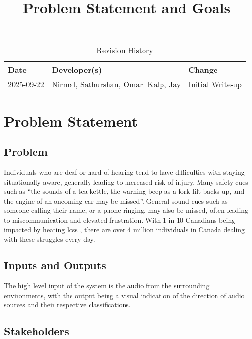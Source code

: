 \documentclass{article}
\title{Problem Statement and Goals\\\progname}
\author{\authname}
\date{}
\begin{document}
\maketitle

\begin{table}[hp]
\caption{Revision History} \label{TblRevisionHistory}
\begin{tabularx}{\textwidth}{llX}
\toprule
\textbf{Date} & \textbf{Developer(s)} & \textbf{Change}\\
\midrule
2025-09-22 & Nirmal, Sathurshan, Omar, Kalp, Jay & Initial Write-up\\
\bottomrule
\end{tabularx}
\end{table}

\section{Problem Statement}

\subsection{Problem}

Individuals who are deaf or hard of hearing tend to have difficulties with
staying situationally aware, generally leading to increased risk of injury. Many
safety cues such as ``the sounds of a tea kettle, the warning beep as a fork lift
backs up, and the engine of an oncoming car may be missed''. \cite{Masterson2016}
General sound cues such as someone calling their name, or a phone ringing, may
also be missed, often leading to miscommunication and elevated frustration. With
1 in 10 Canadians being impacted by hearing loss \cite{Healthing2025}, there are
over 4 million individuals in Canada dealing with these struggles every day.


\subsection{Inputs and Outputs}

The high level input of the system is the audio from the surrounding
environments, with the output being a visual indication of the direction of
audio sources and their respective classifications.

\subsection{Stakeholders}
\end{document}

